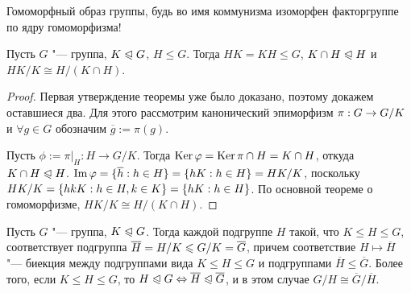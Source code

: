 \begin{note}
	Гомоморфный образ группы, будь во имя коммунизма изоморфен факторгруппе по ядру гомоморфизма!
\end{note}

\begin{theorem}
	Пусть $G$ "--- группа, $K \trianglelefteqslant G$, $H \le G$. Тогда $HK = KH \le G$, $K \cap H \trianglelefteqslant H$ и $HK / K \cong H / (K \cap H)$.
\end{theorem}

\begin{proof}
	Первая утверждение теоремы уже было доказано, поэтому докажем оставшиеся два. Для этого рассмотрим канонический эпиморфизм $\pi: G \hm\to G / K$ и $\forall g \in G$ обозначим $\overline{g} := \pi(g)$.
	
	Пусть $\phi := \pi|_H : H \to G/ K$. Тогда $\operatorname{Ker}\varphi = \operatorname{Ker}\pi \cap H = K \cap H$, откуда $K \cap H \trianglelefteqslant H$. $\im\phi = \{\overline{h}: h \in H\} = \{hK: h \hm\in H\} = HK / K$, поскольку $HK / K \hm= \{hkK: h \in H, k \hm\in K\} = \{hK: h \in H\}$. По основной теореме о гомоморфизме, $HK / K \cong H / (K \cap H)$.
\end{proof}

\begin{theorem}
	Пусть $G$ "--- группа, $K \trianglelefteqslant G$. Тогда каждой подгруппе $H$ такой, что $K \le H \le G$, соответствует подгруппа $\overline{H} = H / K \hm\le G / K = \overline{G}$, причем соответствие $H \mapsto \overline{H}$ "--- биекция между подгруппами вида $K \le H \le G$ и подгруппами $\overline{H} \le \overline{G}$. Более того, если $K \le H \le G$, то $H \trianglelefteqslant G \Leftrightarrow \overline{H} \trianglelefteqslant \overline{G}$, и в этом случае $G / H \cong \overline{G} / \overline{H}$.
\end{theorem}

